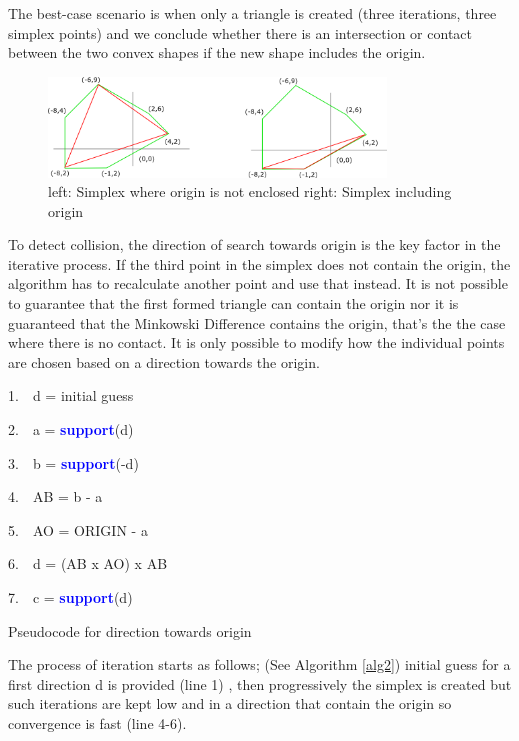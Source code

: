 \documentclass[times,12pt]{ACME2015article}
\newenvironment{lyxcode}
{\par\begin{list}{}{
\setlength{\rightmargin}{\leftmargin}
\setlength{\listparindent}{0pt}%
\raggedright
\setlength{\itemsep}{0pt}
\setlength{\parsep}{0pt}
\normalfont\ttfamily}%
 \item[]}
{\end{list}}
\begin{document}
The best-case scenario is when only a triangle is created (three iterations, three simplex points) and we conclude whether there is an intersection or contact between the two convex shapes if the new shape includes the origin.

  \begin{figure}[!h]
\centering
\includegraphics[width=0.8\textwidth]{2} \protect\caption{\label{fig3}left: Simplex where origin is not enclosed right: Simplex including origin}
\end{figure} 

To detect collision, the direction of search towards origin is the key factor in the iterative process. If the third point in the simplex does not contain the origin, the algorithm has to recalculate another point and use that instead. It is not possible to guarantee that the first formed triangle can contain the origin nor it is guaranteed that the Minkowski Difference contains the origin, that's the the case where there is no contact. It is only possible to modify how the individual points are chosen based on a direction towards the origin.

\begin{algorithm}
\begin{lyxcode}

1.~~d = initial guess

2.~~a = \textbf{\textcolor{blue}{support}}(d) 

3.~~b = \textbf{\textcolor{blue}{support}}(-d)

4.~~AB = b - a

5.~~AO = ORIGIN - a

6.~~d = (AB x AO) x AB

7.~~c = \textbf{\textcolor{blue}{support}}(d)
\end{lyxcode}
\protect\caption{\label{alg2}Pseudocode for direction towards origin}
\end{algorithm}

The process of iteration starts as follows; (See Algorithm \ref{alg2}) initial guess for a first direction d is provided (line 1) , then progressively the simplex is created but such iterations are kept low and in a direction that contain the origin so convergence is fast (line 4-6). 
\end{document}
